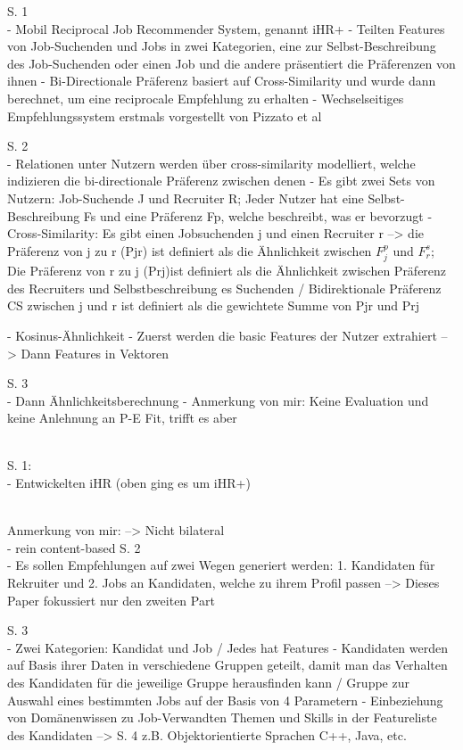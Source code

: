 S. 1\\
- Mobil Reciprocal Job Recommender System, genannt iHR+
- Teilten Features von Job-Suchenden und Jobs in zwei Kategorien, eine zur Selbst-Beschreibung des Job-Suchenden oder einen Job und die andere präsentiert die Präferenzen von ihnen
- Bi-Directionale Präferenz basiert auf Cross-Similarity und wurde dann berechnet, um eine reciprocale Empfehlung zu erhalten
- Wechselseitiges Empfehlungssystem erstmals vorgestellt von Pizzato et al

S. 2\\
- Relationen unter Nutzern werden über cross-similarity modelliert, welche indizieren die bi-directionale Präferenz zwischen denen
- Es gibt zwei Sets von Nutzern: Job-Suchende J und Recruiter R; Jeder Nutzer hat eine Selbst-Beschreibung Fs und eine Präferenz Fp, welche beschreibt, was er bevorzugt
- Cross-Similarity: Es gibt einen Jobsuchenden j und einen Recruiter r --> die Präferenz von j zu r (Pjr) ist definiert als die Ähnlichkeit zwischen $F_j^p$ und $F_r^s$; Die Präferenz von r zu j (Prj)ist definiert als die Ähnlichkeit zwischen Präferenz des Recruiters und Selbstbeschreibung es Suchenden / Bidirektionale Präferenz CS zwischen j und r ist definiert als die gewichtete Summe von Pjr und Prj

- Kosinus-Ähnlichkeit
- Zuerst werden die basic Features der Nutzer extrahiert --> Dann Features in Vektoren

S. 3\\
- Dann Ähnlichkeitsberechnung
- Anmerkung von mir: Keine Evaluation und keine Anlehnung an P-E Fit, trifft es aber

\textcite{hong:2013b}\\
S. 1:\\
- Entwickelten iHR (oben ging es um iHR+)

\textcite{applyingDataMining:2014}\\
Anmerkung von mir: --> Nicht bilateral\\
- rein content-based
S. 2\\
- Es sollen Empfehlungen auf zwei Wegen generiert werden: 1. Kandidaten für Rekruiter und 2. Jobs an Kandidaten, welche zu ihrem Profil passen --> Dieses Paper fokussiert nur den zweiten Part

S. 3\\
- Zwei Kategorien: Kandidat und Job / Jedes hat Features
- Kandidaten werden auf Basis ihrer Daten in verschiedene Gruppen geteilt, damit man das Verhalten des Kandidaten für die jeweilige Gruppe herausfinden kann / Gruppe zur Auswahl eines bestimmten Jobs auf der Basis von 4 Parametern
- Einbeziehung von Domänenwissen zu Job-Verwandten Themen und Skills in der Featureliste des Kandidaten --> S. 4 z.B. Objektorientierte Sprachen C++, Java, etc.

